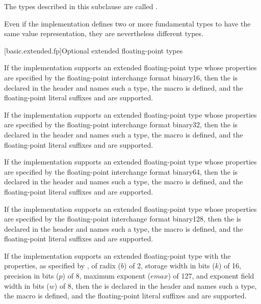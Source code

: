 \pnum
{}%
The types described in this subclause
are called .
\begin{note}
Even if the implementation defines two or more fundamental types to have the
same value representation, they are nevertheless different types.
\end{note}

[basic.extended.fp]{Optional extended floating-point types}

\pnum
If the implementation supports an extended floating-point type
whose properties are specified by
the \IsoFloatUndated{} floating-point interchange format binary16,
then the  
is declared in the header  and names such a type,
the macro  is defined, and
the floating-point literal suffixes  and 
are supported.

\pnum
If the implementation supports an extended floating-point type
whose properties are specified by
the \IsoFloatUndated{} floating-point interchange format binary32,
then the  
is declared in the header  and names such a type,
the macro  is defined, and
the floating-point literal suffixes  and  are supported.

\pnum
If the implementation supports an extended floating-point type
whose properties are specified by
the \IsoFloatUndated{} floating-point interchange format binary64,
then the  
is declared in the header  and names such a type,
the macro  is defined, and
the floating-point literal suffixes  and  are supported.

\pnum
If the implementation supports an extended floating-point type
whose properties are specified by
the \IsoFloatUndated{} floating-point interchange format binary128,
then the  
is declared in the header  and names such a type,
the macro  is defined, and
the floating-point literal suffixes  and  are supported.

\pnum
If the implementation supports an extended floating-point type
with the properties, as specified by \IsoFloatUndated{}, of
radix ($b$) of 2,
storage width in bits ($k$) of 16,
precision in bits ($p$) of 8,
maximum exponent ($emax$) of 127, and
exponent field width in bits ($w$) of 8, then
the  
is declared in the header  and names such a type,
the macro  is defined, and
the floating-point literal suffixes  and  are supported.


